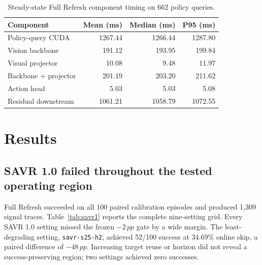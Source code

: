 \documentclass[11pt]{article}
\newcommand{\pp}{\,pp}
\newcommand{\code}[1]{\texttt{#1}}
\begin{document}
\begin{table}[H]
\centering
\small
\caption{Steady-state Full Refresh component timing on 662 policy queries.}
\label{tab:timing}
\begin{tabular}{lrrr}
\toprule
Component & Mean (ms) & Median (ms) & P95 (ms) \\
\midrule
Policy-query CUDA & 1267.44 & 1266.44 & 1287.80 \\
Vision backbone & 191.12 & 193.95 & 199.84 \\
Visual projector & 10.08 & 9.48 & 11.97 \\
Backbone + projector & 201.19 & 203.20 & 211.62 \\
Action head & 5.03 & 5.03 & 5.08 \\
Residual downstream & 1061.21 & 1058.79 & 1072.55 \\
\bottomrule
\end{tabular}
\end{table}

\section{Results}

\subsection{SAVR 1.0 failed throughout the tested operating region}

Full Refresh succeeded on all 100 paired calibration episodes and produced 1,309 signal traces. Table~\ref{tab:savr1} reports the complete nine-setting grid. Every SAVR 1.0 setting missed the frozen $-2\pp$ gate by a wide margin. The least-degrading setting, \code{savr-s25-h2}, achieved 52/100 success at 34.69\% online skip, a paired difference of $-48\pp$. Increasing target reuse or horizon did not reveal a success-preserving region; two settings achieved zero successes.
\end{document}
